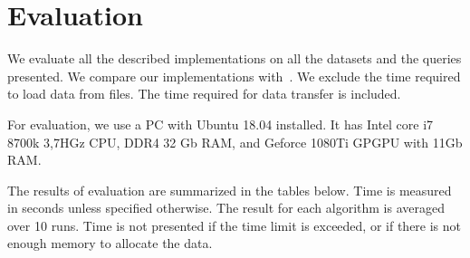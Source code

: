 \section{Evaluation}

We evaluate all the described implementations on all the datasets and the queries presented.
We compare our implementations with~\cite{Azimov:2018:CPQ:3210259.3210264}.
We exclude the time required to load data from files.
The time required for data transfer is included.

For evaluation, we use a PC with Ubuntu 18.04 installed.
It has Intel core i7 8700k 3,7HGz CPU, DDR4 32 Gb RAM, and Geforce 1080Ti GPGPU with 11Gb RAM.

The results of evaluation are summarized in the tables below.
Time is measured in seconds unless specified otherwise.
The result for each algorithm is averaged over 10 runs.
Time is not presented if the time limit is exceeded, or if there is not enough memory to allocate the data.

